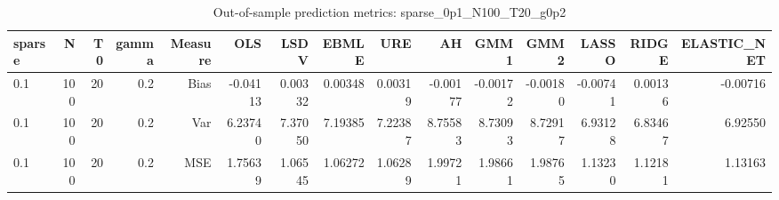 \begin{table}[!htbp]\centering
\caption{Out-of-sample prediction metrics: sparse_0p1_N100_T20_g0p2}
\label{tab:table3_sparse_0p1_N100_T20_g0p2}
\begin{tabular}{lrrrrrrrrrrrrrr}
\hline
sparse & N & T0 & gamma & Measure & OLS & LSDV & EBMLE & URE & AH & GMM1 & GMM2 & LASSO & RIDGE & ELASTIC_NET \\
\hline
0.1 & 100 & 20 & 0.2 & Bias & -0.04113 & 0.00332 & 0.00348 & 0.00319 & -0.00177 & -0.00172 & -0.00180 & -0.00741 & 0.00136 & -0.00716 \\
0.1 & 100 & 20 & 0.2 & Var & 6.23740 & 7.37050 & 7.19385 & 7.22387 & 8.75583 & 8.73093 & 8.72917 & 6.93128 & 6.83467 & 6.92550 \\
0.1 & 100 & 20 & 0.2 & MSE & 1.75639 & 1.06545 & 1.06272 & 1.06289 & 1.99721 & 1.98661 & 1.98765 & 1.13230 & 1.12181 & 1.13163 \\
\hline
\end{tabular}
\end{table}


